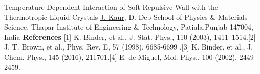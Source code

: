 \begin{abstract_online}{Temperature Dependent Interaction of Soft Repulsive Wall with the Thermotropic Liquid Crystals }{%
        \underline{J. Kaur}, D. Deb}{%
        }{%
        School of Physics & Materials Science, Thapar Institute of Engineering & Technology, Patiala,Punjab-147004, India}
        \textbf{References} \newline{}[1] K. Binder, et al., J. Stat. Phys., 110 (2003), 1411–1514.\newline{}[2] J. T. Brown, et al., Phys. Rev. E, 57 (1998), 6685-6699 .\newline{}[3] K. Binder, et al., J. Chem. Phys., 145 (2016), 211701.\newline{}[4] E. de Miguel, Mol. Phys., 100 (2002), 2449-2459.
    \end{abstract_online}
    